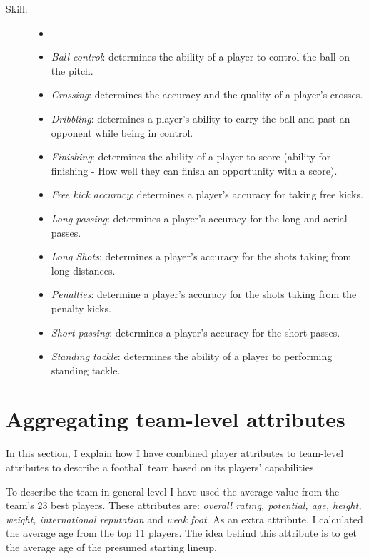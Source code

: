 \begin{description}
\begin{itemize}
    \end{itemize}
    \item[Skill:]
    \begin{itemize}
        \itemsep0.3em
        \item[]
        \item{\textit{Ball control}:} determines the ability of a player to control the ball on the pitch.
        \item{\textit{Crossing}:} determines the accuracy and the quality of a player's crosses.
        \item{\textit{Dribbling}:} determines a player's ability to carry the ball and past an opponent while being in control.
        \item{\textit{Finishing}:} determines the ability of a player to score (ability for finishing - How well they can finish an opportunity with a score).
        \item{\textit{Free kick accuracy}:} determines a player's accuracy for taking free kicks.
        \item{\textit{Long passing}:} determines a player's accuracy for the long and aerial passes.
        \item{\textit{Long Shots}:} determines a player's accuracy for the shots taking from long distances.
        \item{\textit{Penalties}:} determine a player's accuracy for the shots taking from the penalty kicks.
        \item{\textit{Short passing}:} determines a player's accuracy for the short passes.
        \item{\textit{Standing tackle}:} determines the ability of a player to performing standing tackle.

    \end{itemize}

\end{description}

\section{Aggregating team-level attributes}
In this section, I explain how I have combined player attributes to team-level attributes to describe a football team based on its players' capabilities.

To describe the team in general level I have used the average value from the team's 23 best players. These attributes are: \textit{overall rating, potential, age, height, weight, international reputation} and \textit{weak foot}. As an extra attribute, I calculated the average age from the top 11 players. The idea behind this attribute is to get the average age of the presumed starting lineup.

